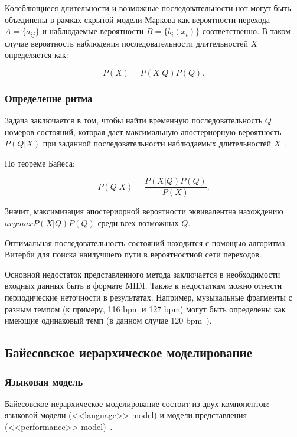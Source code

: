Колеблющиеся длительности и возможные последовательности нот могут быть объединены в рамках скрытой модели Маркова как вероятности перехода $A = \{a_{ij}\}$ и наблюдаемые вероятности $B = \{b_i(x_t)\}$ соответственно. В таком случае вероятность наблюдения последовательности длительностей $X$ определяется как:

\begin{equation}
	P(X) = P(X|Q)P(Q).
\end{equation}

\subsubsection{Определение ритма}

Задача заключается в том, чтобы найти временную последовательность $Q$ номеров состояний, которая дает максимальную апостериорную вероятность $P(Q|X)$ при заданной последовательности наблюдаемых длительностей $X$~\cite{hmm}.

По теореме Байеса:

\begin{equation}
	P(Q|X) = \frac{P(X|Q)P(Q)}{P(X)}.
\end{equation}

Значит, максимизация апостериорной вероятности эквивалентна нахождению $argmax P(X|Q)P(Q)$ среди всех возможных $Q$.

Оптимальная последовательность состояний находится с помощью алгоритма Витерби для поиска наилучшего пути в вероятностной сети переходов.

Основной недостаток представленного метода заключается в необходимости входных данных быть в формате MIDI. Также к недостаткам можно отнести периодические неточности в результатах. Например, музыкальные фрагменты с разным темпом (к примеру, 116 bpm и 127 bpm) могут быть определены как имеющие одинаковый темп (в данном случае 120 bpm~\cite{hmm}).

\subsection{Байесовское иерархическое моделирование}

\subsubsection{Языковая модель}

Байесовское иерархическое моделирование состоит из двух компонентов: языковой модели (<<language>> model) и модели представления (<<performance>> model)~\cite{bayesian}.

